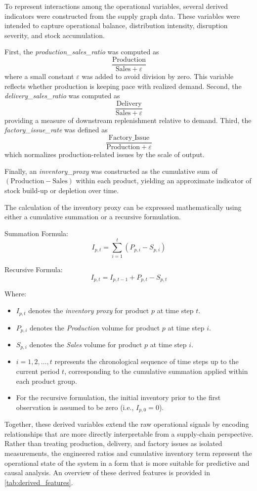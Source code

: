 To represent interactions among the operational variables, several derived indicators were constructed from the supply graph data. These variables were intended to capture operational balance, distribution intensity, disruption severity, and stock accumulation.

First, the \textit{production\_sales\_ratio} was computed as
\[
\frac{\text{Production}}{\text{Sales} + \varepsilon}
\]
where a small constant $\varepsilon$ was added to avoid division by zero. This variable reflects whether production is keeping pace with realized demand. Second, the \textit{delivery\_sales\_ratio} was computed as
\[
\frac{\text{Delivery}}{\text{Sales} + \varepsilon}
\]
providing a measure of downstream replenishment relative to demand. Third, the \textit{factory\_issue\_rate} was defined as
\[
\frac{\text{Factory\_Issue}}{\text{Production} + \varepsilon}
\]
which normalizes production-related issues by the scale of output. 

Finally, an \textit{inventory\_proxy} was constructed as the cumulative sum of $(\text{Production} - \text{Sales})$ within each product, yielding an approximate indicator of stock build-up or depletion over time.

The calculation of the inventory proxy can be expressed mathematically using either a cumulative summation or a recursive formulation.

Summation Formula:
\begin{equation}
I_{p,t} = \sum_{i=1}^{t} \left( P_{p,i} - S_{p,i} \right)
\end{equation}

Recursive Formula:
\begin{equation}
I_{p,t} = I_{p,t-1} + P_{p,t} - S_{p,t}
\end{equation}

\noindent Where:
\begin{itemize}
    \item $I_{p,t}$ denotes the \textit{inventory proxy} for product $p$ at time step $t$.
    \item $P_{p,i}$ denotes the \textit{Production} volume for product $p$ at time step $i$.
    \item $S_{p,i}$ denotes the \textit{Sales} volume for product $p$ at time step $i$.
    \item $i = 1, 2, \dots, t$ represents the chronological sequence of time steps up to the current period $t$, corresponding to the cumulative summation applied within each product group.
    \item For the recursive formulation, the initial inventory prior to the first observation is assumed to be zero (i.e., $I_{p,0} = 0$).
\end{itemize}

Together, these derived variables extend the raw operational signals by encoding relationships that are more directly interpretable from a supply-chain perspective. Rather than treating production, delivery, and factory issues as isolated measurements, the engineered ratios and cumulative inventory term represent the operational
state of the system in a form that is more suitable for predictive and causal analysis. An overview of these derived features is provided in \cref{tab:derived_features}.

